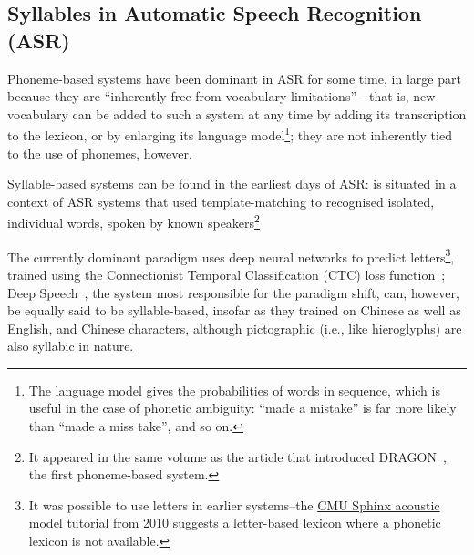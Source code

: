 \documentclass{article}[11pt]
\begin{document}

\subsection{Syllables in Automatic Speech Recognition (ASR)}
\label{ssect:syllasr}

Phoneme-based systems have been dominant in ASR for some time, in large part because they are ``inherently free from vocabulary limitations''~\citep{lopes_phoneme_2011}--that is, new vocabulary can be added to such a system at any time by adding its transcription to the lexicon, or by enlarging its language model\footnote{The language model gives the probabilities of words in sequence, which is useful in the case of phonetic ambiguity: ``made a mistake'' is far more likely than ``made a miss take'', and so on.}; they are not inherently tied to the use of phonemes, however.

Syllable-based systems can be found in the earliest days of ASR: \citet{fujimura_syllable_1975} is situated in a context of ASR systems that used template-matching to recognised isolated, individual words, spoken by known speakers\footnote{It appeared in the same volume as the article that introduced DRAGON~\citep{baker_dragon_1975}, the first phoneme-based system.}

The currently dominant paradigm uses deep neural networks to predict letters\footnote{It was possible to use letters in earlier systems--the \href{http://web.archive.org/web/20100814172908/http://cmusphinx.sourceforge.net/wiki/tutorialam}{CMU Sphinx acoustic model tutorial} from 2010 suggests a letter-based lexicon where a phonetic lexicon is not available.}, trained using the Connectionist Temporal Classification (CTC) loss function~\citep{graves_towards_2014}; Deep Speech~\citep{hannun_deep_2014}, the system most responsible for the paradigm shift, can, however, be equally said to be syllable-based, insofar as they trained on Chinese as well as English, and Chinese characters, although pictographic (i.e., like hieroglyphs) are also syllabic in nature.
\end{document}
